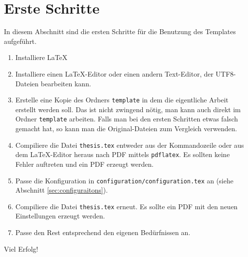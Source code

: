 %
\section{Erste Schritte}
In diesem Abschnitt sind die ersten Schritte für die Benutzung des Templates aufgeführt.
\begin{enumerate}
\item Installiere \LaTeX
\item Installiere einen \LaTeX-Editor oder einen andern Text-Editor, der UTF8-Dateien bearbeiten kann.
\item Erstelle eine Kopie des Ordners \texttt{template} in dem die eigentliche Arbeit erstellt werden soll. Das ist nicht zwingend nötig, man kann auch direkt im Ordner \texttt{template} arbeiten. Falls man bei den ersten Schritten etwas falsch gemacht hat, so kann man die Original-Dateien zum Vergleich verwenden.
\item Compiliere die Datei \texttt{thesis.tex} entweder aus der Kommandozeile oder aus dem \LaTeX-Editor heraus nach PDF mittels \texttt{pdflatex}. Es sollten keine Fehler auftreten und ein PDF erzeugt werden.
\item Passe die Konfiguration in \texttt{configuration/configuration.tex} an (siehe Abschnitt \ref{sec:configuraitons}).
\item Compiliere die Datei \texttt{thesis.tex} erneut. Es sollte ein PDF mit den neuen Einstellungen erzeugt werden.
\item Passe den Rest entsprechend den eigenen Bedürfnissen an.
\end{enumerate}

Viel Erfolg!
